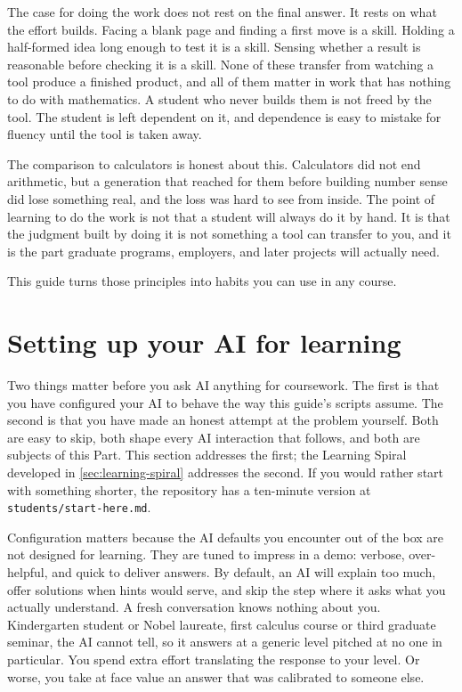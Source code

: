 \documentclass{SIAMbook2023}
\begin{document}
The case for doing the work does not rest on the final answer. It rests on what the effort builds. Facing a blank page and finding a first move is a skill. Holding a half-formed idea long enough to test it is a skill. Sensing whether a result is reasonable before checking it is a skill. None of these transfer from watching a tool produce a finished product, and all of them matter in work that has nothing to do with mathematics. A student who never builds them is not freed by the tool. The student is left dependent on it, and dependence is easy to mistake for fluency until the tool is taken away.

The comparison to calculators is honest about this. Calculators did not end arithmetic, but a generation that reached for them before building number sense did lose something real, and the loss was hard to see from inside. The point of learning to do the work is not that a student will always do it by hand. It is that the judgment built by doing it is not something a tool can transfer to you, and it is the part graduate programs, employers, and later projects will actually need.

This guide turns those principles into habits you can use in any course.

\section{Setting up your AI for learning}
\label{sec:setup}%

Two things matter before you ask AI anything for coursework. The first is that you have configured your AI to behave the way this guide's scripts assume. The second is that you have made an honest attempt at the problem yourself. Both are easy to skip, both shape every AI interaction that follows, and both are subjects of this Part. This section addresses the first; the Learning Spiral developed in \cref{sec:learning-spiral} addresses the second. If you would rather start with something shorter, the repository has a ten-minute version at \texttt{students/start-here.md}.

Configuration matters because the AI defaults you encounter out of the box are not designed for learning. They are tuned to impress in a demo: verbose, over-helpful, and quick to deliver answers. By default, an AI will explain too much, offer solutions when hints would serve, and skip the step where it asks what you actually understand. A fresh conversation knows nothing about you. Kindergarten student or Nobel laureate, first calculus course or third graduate seminar, the AI cannot tell, so it answers at a generic level pitched at no one in particular. You spend extra effort translating the response to your level. Or worse, you take at face value an answer that was calibrated to someone else.
\end{document}
